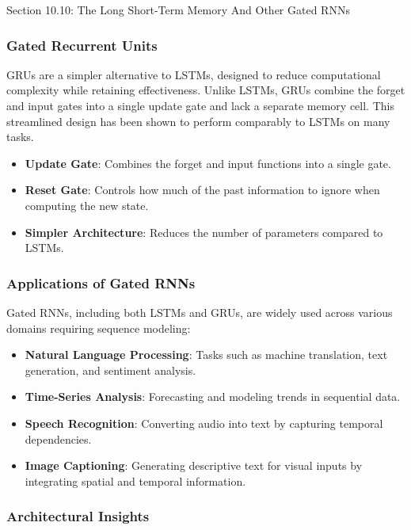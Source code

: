 \begin{notes}{Section 10.10: The Long Short-Term Memory And Other Gated RNNs}
    \subsubsection*{Gated Recurrent Units}
    
    GRUs are a simpler alternative to LSTMs, designed to reduce computational complexity while retaining effectiveness. Unlike LSTMs, GRUs combine the forget and input gates into a single update gate and 
    lack a separate memory cell. This streamlined design has been shown to perform comparably to LSTMs on many tasks.
    
    \begin{highlight}
        \begin{itemize}
            \item \textbf{Update Gate}: Combines the forget and input functions into a single gate.
            \item \textbf{Reset Gate}: Controls how much of the past information to ignore when computing the new state.
            \item \textbf{Simpler Architecture}: Reduces the number of parameters compared to LSTMs.
        \end{itemize}
    \end{highlight}
    
    \subsubsection*{Applications of Gated RNNs}
    
    Gated RNNs, including both LSTMs and GRUs, are widely used across various domains requiring sequence modeling:
    \begin{itemize}
        \item \textbf{Natural Language Processing}: Tasks such as machine translation, text generation, and sentiment analysis.
        \item \textbf{Time-Series Analysis}: Forecasting and modeling trends in sequential data.
        \item \textbf{Speech Recognition}: Converting audio into text by capturing temporal dependencies.
        \item \textbf{Image Captioning}: Generating descriptive text for visual inputs by integrating spatial and temporal information.
    \end{itemize}
    
    \subsubsection*{Architectural Insights}
    

\end{notes}
